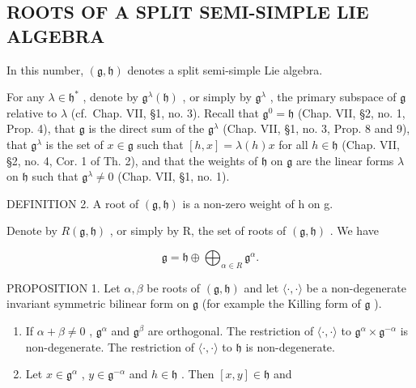 \subsection{ROOTS OF A SPLIT SEMI-SIMPLE LIE ALGEBRA}

In this number, \((\mathfrak{g},\mathfrak{h})\) denotes a split semi-simple Lie algebra.

For any \(\lambda \in \mathfrak{h}^*\) , denote by \(\mathfrak{g}^{\lambda}(\mathfrak{h})\) , or simply by \(\mathfrak{g}^{\lambda}\) , the primary subspace of \(\mathfrak{g}\) relative to \(\lambda\) (cf.~Chap. VII, §1, no. 3). Recall that \(\mathfrak{g}^{0} = \mathfrak{h}\) (Chap. VII, §2, no. 1, Prop. 4), that \(\mathfrak{g}\) is the direct sum of the \(\mathfrak{g}^{\lambda}\) (Chap. VII, §1, no. 3, Prop. 8 and 9), that \(\mathfrak{g}^{\lambda}\) is the set of \(x \in \mathfrak{g}\) such that \([h, x] = \lambda(h)x\) for all \(h \in \mathfrak{h}\) (Chap. VII, §2, no. 4, Cor. 1 of Th. 2), and that the weights of \(\mathfrak{h}\) on \(\mathfrak{g}\) are the linear forms \(\lambda\) on \(\mathfrak{h}\) such that \(\mathfrak{g}^{\lambda} \neq 0\) (Chap. VII, §1, no. 1).

DEFINITION 2. A root of \((\mathfrak{g}, \mathfrak{h})\) is a non-zero weight of h on g.

Denote by \(R(\mathfrak{g},\mathfrak{h})\) , or simply by R, the set of roots of \((\mathfrak{g},\mathfrak{h})\) . We have

\[
\mathfrak {g} = \mathfrak {h} \oplus \bigoplus_ {\alpha \in R} \mathfrak {g} ^ {\alpha}.
\]

PROPOSITION 1. Let \(\alpha, \beta\) be roots of \((\mathfrak{g}, \mathfrak{h})\) and let \(\langle \cdot, \cdot \rangle\) be a non-degenerate invariant symmetric bilinear form on \(\mathfrak{g}\) (for example the Killing form of \(\mathfrak{g}\) ).

\begin{enumerate}
\def\labelenumi{(\roman{enumi})}
\item
  If \(\alpha + \beta \neq 0\) , \(\mathfrak{g}^{\alpha}\) and \(\mathfrak{g}^{\beta}\) are orthogonal. The restriction of \(\langle \cdot, \cdot \rangle\) to \(\mathfrak{g}^{\alpha} \times \mathfrak{g}^{-\alpha}\) is non-degenerate. The restriction of \(\langle \cdot, \cdot \rangle\) to \(\mathfrak{h}\) is non-degenerate.
\item
  Let \(x \in \mathfrak{g}^{\alpha}\) , \(y \in \mathfrak{g}^{-\alpha}\) and \(h \in \mathfrak{h}\) . Then \([x, y] \in \mathfrak{h}\) and
\end{enumerate}

